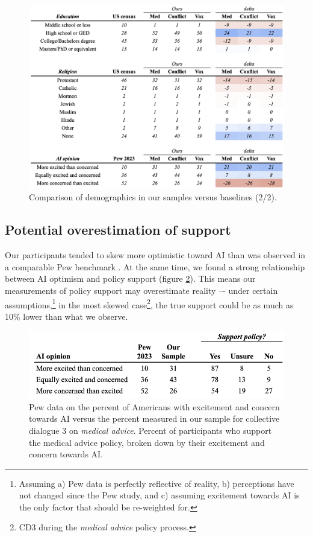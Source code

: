 \documentclass{article}
\begin{document}
\begin{figure}[H]
\centering
\includegraphics[width=1\linewidth]{figs/demos_2.png}
  \caption{Comparison of demographics in our samples versus baselines (2/2).}
  \label{fig:demos 2}
\end{figure}

\subsection{Potential overestimation of support}
Our participants tended to skew more optimistic toward AI than was observed in a comparable Pew benchmark \cite{growing2023tyson}. At the same time, we found a strong relationship between AI optimism and policy support (figure \ref{fig:sample skew}). This means our measurements of policy support may overestimate reality –- under certain assumptions,\footnote{Assuming a) Pew data is perfectly reflective of reality, b) perceptions have not changed since the Pew study, and c) assuming excitement towards AI is the only factor that should be re-weighted for.} in the most skewed case\footnote{CD3 during the \emph{medical advice} policy process.}, the true support could be as much as 10\% lower than what we observe. 

\begin{figure}[H]
\centering
  \includegraphics[width=0.7\linewidth]{figs/sample_skew.png}
  \caption{Pew data on the percent of Americans with excitement and concern towards AI versus the percent measured in our sample for collective dialogue 3 on \emph{medical advice}. Percent of participants who support the medical advice policy, broken down by their excitement and concern towards AI.}
  \label{fig:sample skew}
\end{figure}
\end{document}
